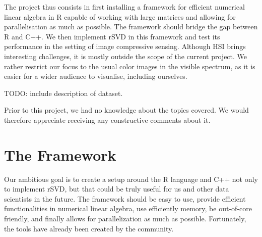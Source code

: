 \documentclass[a4paper,11pt]{amsart}
\begin{document}
The project thus consists in first installing a framework for efficient numerical linear algebra in R capable of working with large matrices and allowing for parallelisation as much as possible. The framework should bridge the gap between R and C++. We then implement rSVD in this framework and test its performance in the setting of image compressive sensing. Although HSI brings interesting challenges, it is mostly outside the scope of the current project. We rather restrict our focus to the usual color images in the visible spectrum, as it is easier for a wider audience to visualise, including ourselves.

TODO: include description of dataset.

Prior to this project, we had no knowledge about the topics covered. We would therefore appreciate receiving any constructive comments about it. 
\section{The Framework}
Our ambitious goal is to create a setup around the R language and C++ not only to implement rSVD, but that could be truly useful for us and other data scientists in the future. The framework should be easy to use, provide efficient functionalities in numerical linear algebra, use efficiently memory, be out-of-core friendly, and finally allows for parallelization as much as possible. Fortunately, the tools have already been created by the community. 

\end{document}
